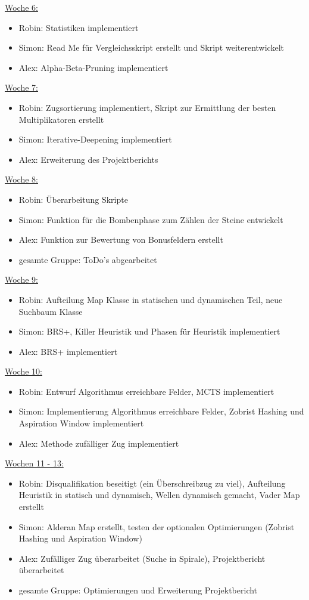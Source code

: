 \documentclass[12pt,a4paper,bibliography=totocnumbered,listof=totocnumbered]{article}
\begin{document}
\underline{Woche 6:}
\begin{itemize}
\item Robin: Statistiken implementiert
\item Simon: Read Me für Vergleichsskript erstellt und Skript weiterentwickelt
\item Alex: Alpha-Beta-Pruning implementiert
\end{itemize}
\underline{Woche 7:}
\begin{itemize}
\item Robin: Zugsortierung implementiert, Skript zur Ermittlung der besten Multiplikatoren erstellt
\item Simon: Iterative-Deepening implementiert
\item Alex: Erweiterung des Projektberichts
\end{itemize}
\underline{Woche 8:}
\begin{itemize}
\item Robin: Überarbeitung Skripte
\item Simon: Funktion für die Bombenphase zum Zählen der Steine entwickelt
\item Alex: Funktion zur Bewertung von Bonusfeldern erstellt
\item gesamte Gruppe: ToDo's abgearbeitet
\end{itemize}
\underline{Woche 9:}
\begin{itemize}
\item Robin: Aufteilung Map Klasse in statischen und dynamischen Teil, neue Suchbaum Klasse
\item Simon: BRS+, Killer Heuristik und Phasen für Heuristik implementiert
\item Alex: BRS+ implementiert
\end{itemize}
\underline{Woche 10:}
\begin{itemize}
\item Robin: Entwurf Algorithmus erreichbare Felder, MCTS implementiert
\item Simon: Implementierung Algorithmus erreichbare Felder, Zobrist Hashing und Aspiration Window implementiert
\item Alex: Methode zufälliger Zug implementiert
\end{itemize}
\underline{Wochen 11 - 13:}
\begin{itemize}
\item Robin: Disqualifikation beseitigt (ein Überschreibzug zu viel), Aufteilung Heuristik in statisch und dynamisch, Wellen dynamisch gemacht, Vader Map erstellt
\item Simon: Alderan Map erstellt, testen der optionalen Optimierungen (Zobrist Hashing und Aspiration Window)
\item Alex: Zufälliger Zug überarbeitet (Suche in Spirale), Projektbericht überarbeitet
\item gesamte Gruppe: Optimierungen und Erweiterung Projektbericht
\end{itemize}
\end{document}
